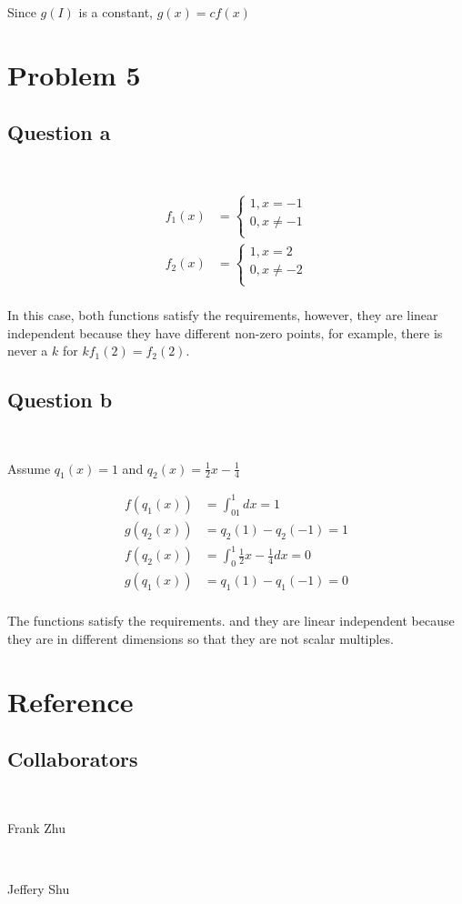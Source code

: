 \documentclass{article}
\begin{document}
Since $g(I)$ is a constant, $g(x)=cf(x)$
\newpage

\section{Problem 5}

\subsection{Question a}

~

\begin{equation*}
\begin{split}
f_1(x)&=\begin{cases}
1,x=-1\\
0,x\ne -1\\
\end{cases}\\
f_2(x)&=\begin{cases}
1,x=2\\
0,x\ne-2\\
\end{cases}\\
\end{split}
\end{equation*}

In this case, both functions satisfy the requirements, however, they are linear independent because they have different non-zero points, for example, there is never a $k$ for $kf_1(2)=f_2(2)$.

\subsection{Question b}

~

Assume $q_1(x)=1$ and $q_2(x)=\frac{1}{2}x-\frac{1}{4}$

\begin{equation*}
\begin{split}
f(q_1(x))&=\int^1_01dx=1\\
g(q_2(x))&=q_2(1)-q_2(-1)=1\\
f(q_2(x))&=\int^1_0\frac{1}{2}x-\frac{1}{4}dx=0\\
g(q_1(x))&=q_1(1)-q_1(-1)=0\\
\end{split}
\end{equation*}

The functions satisfy the requirements. and they are linear independent because they are in different dimensions so that they are not scalar multiples.

\newpage

\section{Reference}

\subsection{Collaborators}

~

Frank Zhu

~

Jeffery Shu
\end{document}
